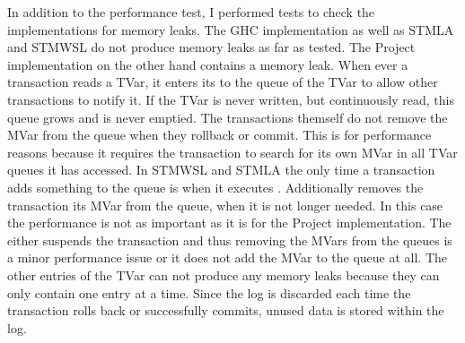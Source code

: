 In addition to the performance test, I performed tests to check the implementations for memory leaks. The GHC implementation
as well as STMLA and STMWSL do not produce memory leaks as far as tested. The Project implementation on the other hand 
contains a memory leak. When ever a transaction reads a TVar, it enters its  to the queue of the TVar
to allow other transactions to notify it. If the TVar is never written, but continuously read, this queue grows
and is never emptied. The transactions themself do not remove the MVar from the queue when they rollback or commit.
This is for performance reasons because it requires the transaction to search for its own MVar in all TVar queues it 
has accessed. In STMWSL and STMLA the only time a transaction adds something to the queue is when it executes 
. Additionally removes the transaction its MVar from the queue, when it is not longer needed. In this 
case the performance is not as important as it is for the Project implementation. The  either suspends 
the transaction and thus removing the MVars from the queues is a minor performance issue or it does not add the MVar to
the queue at all. The other entries of the TVar can not produce any memory leaks because they can only contain one entry
at a time. Since the log is discarded each time the transaction rolls back or successfully commits, unused data is stored
within the log.